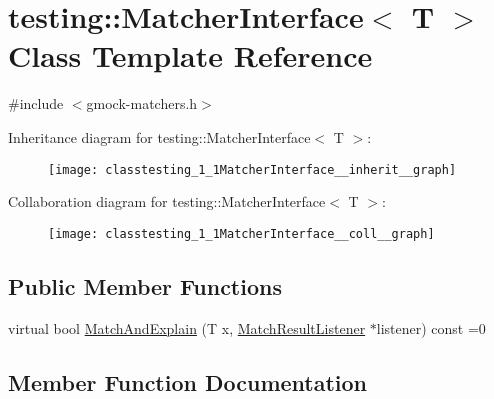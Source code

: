 \hypertarget{classtesting_1_1MatcherInterface}{}\section{testing\+:\+:Matcher\+Interface$<$ T $>$ Class Template Reference}
\label{classtesting_1_1MatcherInterface}


{\ttfamily \#include $<$gmock-\/matchers.\+h$>$}



Inheritance diagram for testing\+:\+:Matcher\+Interface$<$ T $>$\+:
\nopagebreak
\begin{figure}[H]
\begin{center}
\leavevmode
\texttt{[image: classtesting\_1\_1MatcherInterface\_\_inherit\_\_graph]}
\end{center}
\end{figure}


Collaboration diagram for testing\+:\+:Matcher\+Interface$<$ T $>$\+:
\nopagebreak
\begin{figure}[H]
\begin{center}
\leavevmode
\texttt{[image: classtesting\_1\_1MatcherInterface\_\_coll\_\_graph]}
\end{center}
\end{figure}
\subsection*{Public Member Functions}
\begin{DoxyCompactItemize}
\item 
virtual bool \hyperlink{classtesting_1_1MatcherInterface_a296b43607cd99d60365f0e6a762777cf}{Match\+And\+Explain} (T x, \hyperlink{classtesting_1_1MatchResultListener}{Match\+Result\+Listener} $\ast$listener) const =0
\end{DoxyCompactItemize}


\subsection{Member Function Documentation}
